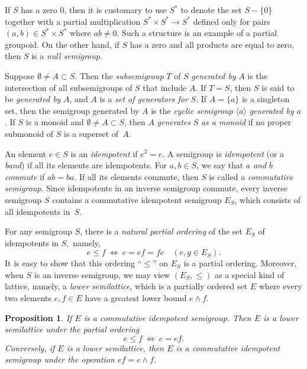 \documentclass{surv-l}
\numberwithin{equation}{section}
\numberwithin{table}{section}
\numberwithin{figure}{section}
\theoremstyle{plain}
\newtheorem{proposition}[equation]{Proposition}
\theoremstyle{definition}
\begin{document}
If $S$ has a zero $0$, then it is customary to use $S^{\ast}$ to
denote the set $S-\{0\}$ together with a partial multiplication
$S^{\ast}\times S^{\ast}\rightarrow S^{\ast}$ defined only for
pairs $(a,b)\in S^{\ast}\times S^{\ast}$ where $ab\neq 0$. Such a
structure is an example of a partial groupoid. On the other
hand, if $S$ has a zero and all products are equal to zero, then
$S$ is a \emph{null semigroup}.

Suppose $\emptyset\neq A\subset S$. Then the \emph{subsemigroup}
$T$ of $S$ \emph{generated by} $A$ is the
intersection of all subsemigroups of $S$ that include $A$. If
$T=S$, then $S$ is said to be \emph{generated by} $A$, and $A$ is a
\emph{set of generators for} $S$. If $A=\{a\}$ is a singleton
set, then the semigroup generated by $A$ is the \emph{cyclic
semigroup} $\langle a\rangle$ \emph{generated by} $a$. If $S$ is a monoid and
$\emptyset\neq A\subset S$, then $A$ \emph{generates} $S$ \emph{as
a monoid} if no proper submonoid of $S$ is a superset of~$A$.

An element $e\in S$ is an \emph{idempotent} if $e^{2}=e$. A
semigroup is \emph{idempotent} (or a
\emph{band}) if all its elements are idempotents. For
$a, b\in S$, we say that $a$ \emph{and} $b$ \emph{commute} if
$ab=ba$. If all its elements commute, then $S$ is called a
\emph{commutative semigroup}. Since
idempotents in an inverse semigroup commute, every inverse
semigroup $S$ contains a commutative idempotent semigroup $E_{S}$,
which consists of all idempotents in~$S$.

For any semigroup $S$, there is a \emph{natural partial
ordering} of the set $E_{S}$ of
idempotents in $S$,~namely,
\[
e\leq f\ \Leftrightarrow\ e=ef=fe\quad (e, g\in E_{S}).
\]
It is easy to show that this ordering ``$\leq$'' on $E_{S}$ is a
partial ordering. Moreover, when $S$ is an inverse semigroup, we
may view $(E_{S}, \leq)$ as a special kind of lattice, namely, a
\emph{lower semilattice}, which is a partially ordered set $E$
where every two elements $e, f\in E$ have a greatest lower bound
$e\wedge f$.

\begin{proposition}\label{propA.75.1}
If $E$ is a commutative idempotent
semigroup. Then $E$ is a lower
semilattice under the partial ordering
\[
e\leq f\ \Leftrightarrow\ e=ef.
\]
Conversely, if $E$ is a lower semilattice, then $E$ is a
commutative idempotent semigroup under the operation
$ef=e\wedge f$.
\end{proposition}
\end{document}
